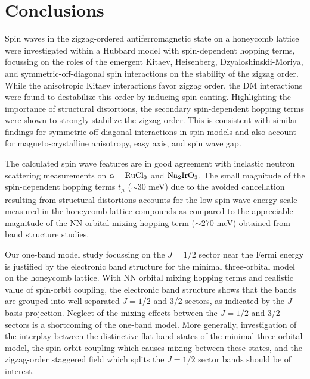 \documentclass[aps,prb,fleqn,12pt,amsmath,amssymb]{revtex4}
\begin{document}

\section{Conclusions}

Spin waves in the zigzag-ordered antiferromagnetic state on a honeycomb lattice were investigated within a Hubbard model with spin-dependent hopping terms, focussing on the roles of the emergent Kitaev, Heisenberg, Dzyaloshinskii-Moriya, and symmetric-off-diagonal spin interactions on the stability of the zigzag order. While the anisotropic Kitaev interactions favor zigzag order, the DM interactions were found to destabilize this order by inducing spin canting. Highlighting the importance of structural distortions, the secondary spin-dependent hopping terms were shown to strongly stabilize the zigzag order. This is consistent with similar findings for symmetric-off-diagonal interactions in spin models and also account for magneto-crystalline anisotropy, easy axis, and spin wave gap. 

The calculated spin wave features are in good agreement with inelastic neutron scattering measurements on $\rm \alpha - RuCl_3$ and $\rm Na_2 Ir O_3$. The small magnitude of the spin-dependent hopping terms $t_\mu$ ($\sim 30$ meV) due to the avoided cancellation resulting from structural distortions accounts for the low spin wave energy scale measured in the honeycomb lattice compounds as compared to the appreciable magnitude of the NN orbital-mixing hopping term ($\sim 270$ meV) obtained from band structure studies. 


Our one-band model study focussing on the $J=1/2$ sector near the Fermi energy is justified by the electronic band structure for the minimal three-orbital model on the honeycomb lattice. With NN orbital mixing hopping terms and realistic value of spin-orbit coupling, the electronic band structure shows that the bands are grouped into well separated $J=1/2$ and 3/2 sectors, as indicated by the $J$-basis projection. Neglect of the mixing effects between the $J=1/2$ and 3/2 sectors is a
shortcoming of the one-band model. More generally, investigation of the interplay between the distinctive flat-band states of the minimal three-orbital model, the spin-orbit coupling which causes mixing between these states, and the zigzag-order staggered field which splits the $J=1/2$ sector bands should be of interest. 
\end{document}
